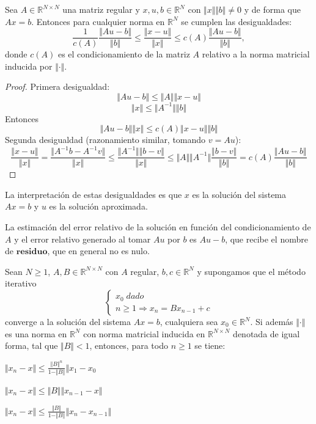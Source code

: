 \begin{nprop}
Sea $A \in \mathbb{R}^{N \times N}$ una matriz regular y $x, u, b \in \mathbb{R}^N$ con $\Vert x \Vert \Vert b \Vert \neq 0$ y de forma que $Ax = b$. Entonces para cualquier norma en $\mathbb{R}^N$ se cumplen las desigualdades:
\[
\frac{1}{c(A)} \frac{\Vert Au-b \Vert } {\Vert b \Vert } 
\leq
\frac{\Vert x-u \Vert }{\Vert x \Vert }
\leq
c(A) \frac{\Vert Au-b \Vert } {\Vert b \Vert },
\]
donde $c(A)$ es el condicionamiento de la matriz $A$ relativo a la norma matricial inducida por $\Vert \cdot \Vert$.
\end{nprop}
	\begin{proof}
	Primera desigualdad:
	\[ \Vert Au - b \Vert \leq \Vert A \Vert \Vert x-u \Vert \]
	\[ \Vert x \Vert \leq \Vert A^{-1} \Vert \Vert b \Vert \]
	Entonces
	\[ \Vert Au-b \Vert \Vert x \Vert \leq c(A) \Vert x-u \Vert \Vert b \Vert \]
	Segunda desigualdad (razonamiento similar, tomando $v=Au$):
	\[
	\frac{\Vert x-u \Vert }{\Vert x \Vert } = \frac{\Vert A^{-1}b-A^{-1}v \Vert }{\Vert x \Vert }
	\leq
	\frac{\Vert A^{-1} \Vert \Vert b-v \Vert }{\Vert x \Vert }
	\leq
	\Vert A \Vert \Vert A^{-1} \Vert \frac{\Vert b-v \Vert }{\Vert b \Vert }
	=
	c(A) \frac{\Vert Au-b \Vert }{\Vert b \Vert }
	\]
	\end{proof}
	
La interpretación de estas desigualdades es que $x$ es la solución del sistema $Ax = b$ y $u$ es la solución aproximada.

La estimación del error relativo de la solución en función del condicionamiento de $A$ y el error relativo generado al tomar $Au$ por $b$ es $Au - b$, que recibe el nombre de $\textbf{residuo}$, que en general no es nulo.

\begin{nprop}
Sean $N \geq 1$, $A, B \in \mathbb{R}^{N \times N}$ con $A$ regular, $b,c \in \mathbb{R}^N$ y supongamos que el método iterativo
\[ \left\{ \begin{array}{l}
x_0 \; dado \\
n \geq 1 \Rightarrow x_n = Bx_{n-1} + c
\end{array}
\right. \]
converge a la solución del sistema $Ax = b$, cualquiera sea $x_0 \in \mathbb{R}^N$. Si además $\Vert \cdot \Vert$ es una norma en $\mathbb{R}^N$ con norma matricial inducida en $\mathbb{R}^{N \times N}$ denotada de igual forma, tal que $\Vert B \Vert < 1$, entonces, para todo $n \geq 1$ se tiene:
	\begin{nlist}
	\item $\Vert x_n - x \Vert \leq \frac{\Vert B \Vert ^n}{1 - \Vert B \Vert} \Vert x_1 - x_0$
	\item $\Vert x_n - x \Vert \leq \Vert B \Vert \Vert x_{n-1} - x \Vert$
	\item $\Vert x_n - x \Vert \leq \frac{\Vert B \Vert}{1 - \Vert B \Vert} \Vert x_n - x_{n-1} \Vert$
	\end{nlist}
\end{nprop}


